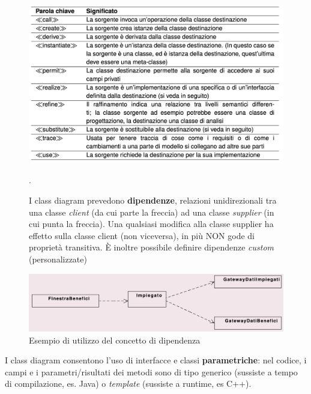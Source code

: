 \begin{figure}[h!]
    \centering
    \includegraphics[width=1\linewidth]{assets/UML/class/class-10.png}
    \caption{I class diagram prevedono \textbf{dipendenze}, relazioni unidirezionali tra una classe \textit{client} (da cui parte la freccia) ad una classe \textit{supplier} (in cui punta la freccia). Una qualsiasi modifica alla classe supplier ha effetto sulla classe client (non viceversa), in più NON gode di proprietà transitiva. È inoltre possibile definire dipendenze \textit{custom} (personalizzate)}.
\end{figure}

\begin{figure}[h!]
    \centering
    \includegraphics[width=1\linewidth]{assets/UML/class/class-5.png}
    \caption{Esempio di utilizzo del concetto di dipendenza}
\end{figure}

I class diagram consentono l'uso di interfacce e classi \textbf{parametriche}: nel codice, i campi e i parametri/risultati dei metodi sono di tipo generico (sussiste a tempo di compilazione, es. Java) o \textit{template} (sussiste a runtime, es C++).


